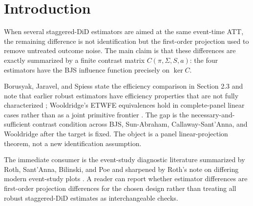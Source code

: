 \documentclass[11pt]{article}
\theoremstyle{definition}
\theoremstyle{plain}
\theoremstyle{remark}
\begin{document}
\begin{abstract}
Modern staggered-DiD estimators can identify the same aggregated ATT while using
different first-order projections of untreated residual variation. This proposal
asks for the exact primitive frontier on which BJS imputation, Sun-Abraham
interaction weights, Callaway-Sant'Anna doubly robust group-time estimation, and
Wooldridge cohort-time saturated TWFE have the same influence function. The
kernel is a conjectured contrast matrix \(C(\pi,\Sigma,S,a)\), derived from
those normal equations, such that first-order equivalence holds if and only if
\(C(\pi,\Sigma,S,a)\tau=0\). Off the frontier, the raw variance difference is a
cross-covariance identity, and its BJS-orthogonal component is
\(\|C_m\tau\|_{\Sigma}^2\). A companion
conjecture defines a corrected recovery map that recovers the BJS influence
function from the four normal-equation designs rather than from an unspecified
projection loss. Resolving the conjecture
would turn estimator comparisons in staggered DiD from qualitative robustness
claims into a finite, checkable diagnostic.
\end{abstract}

\section{Introduction}
When several staggered-DiD estimators are aimed at the same event-time ATT, the
remaining difference is not identification but the first-order projection used
to remove untreated outcome noise. The main claim is that these differences are
exactly summarized by a finite contrast matrix \(C(\pi,\Sigma,S,a)\): the four
estimators have the BJS influence function precisely on \(\ker C\).

Borusyak, Jaravel, and Spiess state the efficiency comparison in Section 2.3 and
note that earlier robust estimators have efficiency properties that are not
fully characterized \citep{borusyak_jaravel_spiess_2024_restud}; Wooldridge's
ETWFE equivalences hold in complete-panel linear cases rather than as a joint
primitive frontier \citep[Section 3]{wooldridge_2023_ectj}. The gap is the
necessary-and-sufficient contrast condition across BJS, Sun-Abraham,
Callaway-Sant'Anna, and Wooldridge after the target is fixed. The object is a
panel linear-projection theorem, not a new identification assumption.

The immediate consumer is the event-study diagnostic literature summarized by
Roth, Sant'Anna, Bilinski, and Poe \citep{roth_santanna_bilinski_poe_2023_joe}
and sharpened by Roth's note on differing modern event-study plots
\citep{roth_2026_eventstudy_note}. A reader can report whether estimator
differences are first-order projection differences for the chosen design rather
than treating all robust staggered-DiD estimates as interchangeable checks.
\end{document}
